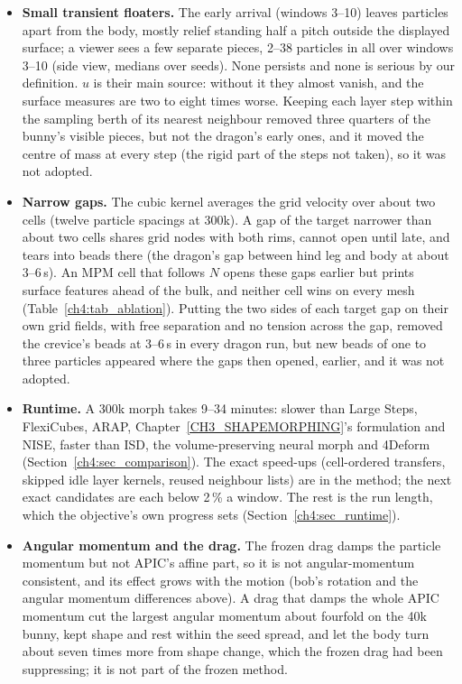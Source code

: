 \begin{itemize}
  \item \textbf{Small transient floaters.} The early arrival (windows 3--10) leaves particles apart from the body,
        mostly relief standing half a pitch outside the displayed surface; a viewer sees a few separate pieces, 2--38
        particles in all over windows 3--10 (side view, medians over seeds). None persists and none is serious by our
        definition. $u$ is their main source: without it they almost vanish, and the surface measures are two to eight
        times worse. Keeping each layer step within the sampling berth of its nearest neighbour removed three quarters of
        the bunny's visible pieces, but not the dragon's early ones, and it moved the centre of mass at every step (the
        rigid part of the steps not taken), so it was not adopted.
  \item \textbf{Narrow gaps.} The cubic kernel averages the grid velocity over about two cells (twelve particle spacings at
        300k). A gap of the target narrower than about two cells shares grid nodes with both rims, cannot open until late,
        and tears into beads there (the dragon's gap between hind leg and body at about 3--6\,s). An MPM cell that follows
        $N$ opens these gaps earlier but prints surface features ahead of the bulk, and neither cell wins on every mesh
        (Table~\ref{ch4:tab_ablation}). Putting the two sides of each target gap on their own grid fields, with free
        separation and no tension across the gap, removed the crevice's beads at 3--6\,s in every dragon run, but new
        beads of one to three particles appeared where the gaps then opened, earlier, and it was not adopted.
  \item \textbf{Runtime.} A 300k morph takes 9--34 minutes: slower than Large Steps, FlexiCubes, ARAP,
        Chapter~\ref{CH3_SHAPEMORPHING}'s formulation and NISE, faster than ISD, the volume-preserving neural morph and
        4Deform (Section~\ref{ch4:sec_comparison}). The exact speed-ups (cell-ordered transfers, skipped
        idle layer kernels, reused neighbour lists) are in the method; the next exact candidates are each below 2\,\% a
        window. The rest is the run length, which the objective's own progress sets (Section~\ref{ch4:sec_runtime}).
  \item \textbf{Angular momentum and the drag.} The frozen drag damps the particle momentum but not APIC's affine part,
        so it is not angular-momentum consistent, and its effect grows with the motion (bob's rotation and the angular
        momentum differences above). A drag that damps the whole APIC momentum cut the largest angular momentum about
        fourfold on the 40k bunny, kept shape and rest within the seed spread, and let the body turn about seven times
        more from shape change, which the frozen drag had been suppressing; it is not part of the frozen method.
\end{itemize}
